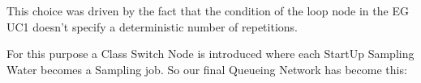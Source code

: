 This choice was driven by the fact that the condition of the loop node in the EG UC1 doesn't specify a deterministic number of repetitions.

\begin{center}
\end{center}
\bigskip
{}
\bigskip

For this purpose a Class Switch Node is introduced where each StartUp Sampling Water becomes a Sampling job.
So our final Queueing Network has become this:
 
\bigskip
\begin{center}
\end{center}
\bigskip
{}